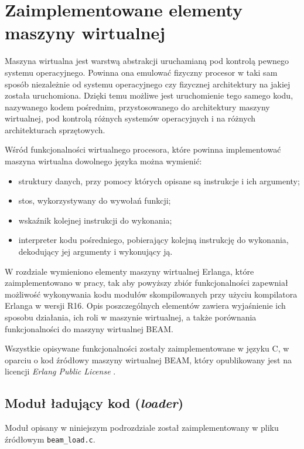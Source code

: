 \chapter{Zaimplementowane elementy maszyny wirtualnej}
\label{cha:maszyna}

Maszyna wirtualna jest warstwą abstrakcji uruchamianą pod kontrolą pewnego systemu operacyjnego.
Powinna ona emulować fizyczny procesor w taki sam sposób niezależnie od systemu operacyjnego czy fizycznej architektury na jakiej została uruchomiona.
Dzięki temu możliwe jest uruchomienie tego samego kodu, nazywanego kodem pośrednim, przystosowanego do architektury maszyny wirtualnej, pod kontrolą różnych systemów operacyjnych i na różnych architekturach sprzętowych.

Wśród funkcjonalności wirtualnego procesora, które powinna implementować maszyna wirtualna dowolnego języka można wymienić:
\begin{itemize}
\item struktury danych, przy pomocy których opisane są instrukcje i ich argumenty;
\item stos, wykorzystywany do wywołań funkcji;
\item wskaźnik kolejnej instrukcji do wykonania;
\item interpreter kodu pośredniego, pobierający kolejną instrukcję do wykonania, dekodujący jej argumenty i wykonujący ją.
\end{itemize}

W rozdziale wymieniono elementy maszyny wirtualnej Erlanga, które zaimplementowano w pracy, tak aby powyższy zbiór funkcjonalności zapewniał możliwość wykonywania kodu modułów skompilowanych przy użyciu kompilatora Erlanga w wersji R16.
Opis poszczególnych elementów zawiera wyjaśnienie ich sposobu działania, ich roli w maszynie wirtualnej, a także porównania
funkcjonalności do maszyny wirtualnej BEAM.

Wszystkie opisywane funkcjonalności zostały zaimplementowane w języku C, w oparciu o kod źródłowy maszyny wirtualnej BEAM, który opublikowany jest na licencji \emph{Erlang Public License} \cite{epl}.

\section{Moduł ładujący kod (\emph{loader})}
\label{sec:maszynaLoader}

Moduł opisany w niniejszym podrozdziale został zaimplementowany w pliku źródłowym \texttt{beam\_load.c}.

